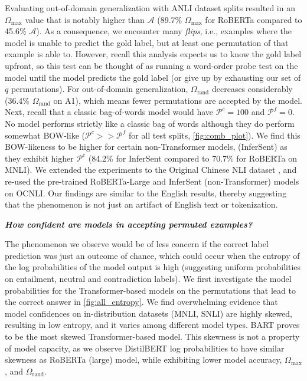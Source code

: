 \documentclass[12pt]{article}
\newcommand{\xit}[1]{{\noindent\textbf{\textit{#1}}}}
\begin{document}
Evaluating out-of-domain generalization with ANLI dataset splits resulted in an $\Omega_{\text{max}}$ value that is notably higher than $\mathcal{A}$ (89.7\% $\Omega_{\text{max}}$ for RoBERTa compared to 45.6\% $\mathcal{A}$). As a consequence, we encounter many \textit{flips}, i.e., examples where the model is unable to predict the gold label, but at least one permutation of that example is able to. However, recall this analysis expects us to know the gold label upfront, so this test can be thought of as running a word-order probe test on the model until the model predicts the gold label (or give up by exhausting our set of $q$ permutations). For out-of-domain generalization, $\Omega_{\text{rand}}$ decreases considerably (36.4\% $\Omega_{\text{rand}}$ on A1), which means fewer permutations are accepted by the model. Next, recall that a classic bag-of-words model would have $\mathcal{P}^c=100$ and $\mathcal{P}^f=0$. No model performs strictly like a classic bag of words although they do perform somewhat BOW-like ($\mathcal{P}^c >> \mathcal{P}^f$ for all test splits, \autoref{fig:comb_plot}).
We find this BOW-likeness to be higher for certain non-Transformer models, (InferSent) as they exhibit higher $\mathcal{P}^c$ (84.2\% for InferSent compared to 70.7\% for RoBERTa on MNLI). We extended the experiments to the Original Chinese NLI dataset \citep[OCNLI]{hu-etal-2020-ocnli}, and re-used the pre-trained RoBERTa-Large and InferSent (non-Transformer) models on OCNLI. Our findings are similar to the English results, thereby suggesting that the phenomenon is not just an artifact of English text or tokenization.


\xit{How confident are models in accepting permuted examples?}

The phenomenon we observe would be of less concern if the correct label prediction was just an outcome of chance, which could occur when the entropy of the log probabilities of the model output is high (suggesting uniform probabilities on entailment, neutral and contradiction labels). We first investigate the model probabilities for the Transformer-based models on the permutations that lead to the correct answer in \autoref{fig:all_entropy}. We find overwhelming evidence that model confidences on in-distribution datasets (MNLI, SNLI) are highly skewed, resulting in low entropy, and it varies among different model types. BART proves to be the most skewed Transformer-based model. This skewness is not a property of model capacity, as we observe DistilBERT log probabilities to have similar skewness as RoBERTa (large) model, while exhibiting lower model accuracy, $\Omega_{\text{max}}$, and $\Omega_{\text{rand}}$.
\end{document}
